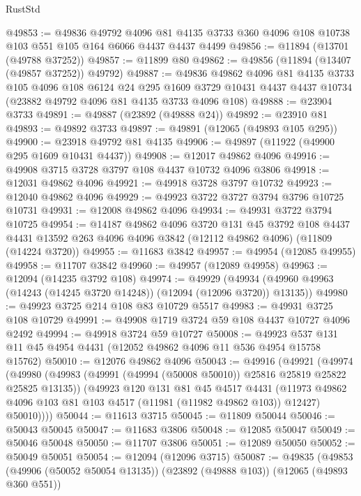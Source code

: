 \begin{lexlean}{RustStd}
\begin{coremodule}
@49853 := @49836
    @49792
    @4096
    @81
    @4135
    @3733
    @360
    @4096
    @108
    @10738
    @103
    @551
    @105
    @164
    @6066
    @4437
    @4437
    @4499
@49856 := @11894 (@13701 (@49788 @37252))
@49857 := @11899 @80
@49862 := @49856 (@11894 (@13407 (@49857 @37252)) @49792)
@49887 := @49836
    @49862
    @4096
    @81
    @4135
    @3733
    @105
    @4096
    @108
    @6124
    @24
    @295
    @1609
    @3729
    @10431
    @4437
    @4437
    @10734
    (@23882 @49792 @4096 @81 @4135 @3733 @4096 @108)
@49888 := @23904 @3733
@49891 := @49887 (@23892 (@49888 @24))
@49892 := @23910 @81
@49893 := @49892 @3733
@49897 := @49891 (@12065 (@49893 @105 @295))
@49900 := @23918 @49792 @81 @4135
@49906 := @49897 (@11922 (@49900 @295 @1609 @10431 @4437))
@49908 := @12017 @49862 @4096
@49916 := @49908 @3715 @3728 @3797 @108 @4437 @10732 @4096 @3806
@49918 := @12031 @49862 @4096
@49921 := @49918 @3728 @3797 @10732
@49923 := @12040 @49862 @4096
@49929 := @49923 @3722 @3727 @3794 @3796 @10725 @10731
@49931 := @12008 @49862 @4096
@49934 := @49931 @3722 @3794 @10725
@49954 := @14187
    @49862
    @4096
    @3720
    @131
    @45
    @3792
    @108
    @4437
    @4431
    @13592
    @263
    @4096
    @4096
    @3842
    (@12112 @49862 @4096)
    (@11809 (@14224 @3720))
@49955 := @11683 @3842
@49957 := @49954 (@12085 @49955)
@49958 := @11707 @3842
@49960 := @49957 (@12089 @49958)
@49963 := @12094 (@14235 @3792 @108)
@49974 := @49929
    (@49934 (@49960 @49963 (@14243 (@14245 @3720 @14248)) (@12094 (@12096 @3720)) @13135))
@49980 := @49923 @3725 @214 @108 @83 @10729 @5517
@49983 := @49931 @3725 @108 @10729
@49991 := @49908 @1719 @3724 @59 @108 @4437 @10727 @4096 @2492
@49994 := @49918 @3724 @59 @10727
@50008 := @49923 @537 @131 @11 @45 @4954 @4431 (@12052 @49862 @4096 @11 @536 @4954 @15758 @15762)
@50010 := @12076 @49862 @4096
@50043 := @49916
    (@49921
      (@49974
        (@49980
          (@49983 (@49991 (@49994 (@50008 @50010)) @25816 @25819 @25822 @25825 @13135))
          (@49923
            @120
            @131
            @81
            @45
            @4517
            @4431
            (@11973 @49862 @4096 @103 @81 @103 @4517 (@11981 (@11982 @49862 @103)) @12427)
            @50010))))
@50044 := @11613 @3715
@50045 := @11809 @50044
@50046 := @50043 @50045
@50047 := @11683 @3806
@50048 := @12085 @50047
@50049 := @50046 @50048
@50050 := @11707 @3806
@50051 := @12089 @50050
@50052 := @50049 @50051
@50054 := @12094 (@12096 @3715)
@50087 := @49835
    (@49853
      (@49906 (@50052 @50054 @13135))
      (@23892 (@49888 @103))
      (@12065 (@49893 @360 @551))

\end{coremodule}
\end{lexlean}
